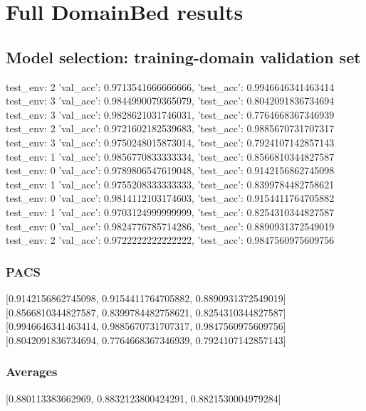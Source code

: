 \documentclass{article}
\begin{document}
\section{Full DomainBed results}

\subsection{Model selection: training-domain validation set}
test_env: 2
{'val_acc': 0.9713541666666666, 'test_acc': 0.9946646341463414}
test_env: 3
{'val_acc': 0.9844990079365079, 'test_acc': 0.8042091836734694}
test_env: 3
{'val_acc': 0.9828621031746031, 'test_acc': 0.7764668367346939}
test_env: 2
{'val_acc': 0.9721602182539683, 'test_acc': 0.9885670731707317}
test_env: 3
{'val_acc': 0.9750248015873014, 'test_acc': 0.7924107142857143}
test_env: 1
{'val_acc': 0.9856770833333334, 'test_acc': 0.8566810344827587}
test_env: 0
{'val_acc': 0.9789806547619048, 'test_acc': 0.9142156862745098}
test_env: 1
{'val_acc': 0.9755208333333333, 'test_acc': 0.8399784482758621}
test_env: 0
{'val_acc': 0.9814112103174603, 'test_acc': 0.9154411764705882}
test_env: 1
{'val_acc': 0.9703124999999999, 'test_acc': 0.8254310344827587}
test_env: 0
{'val_acc': 0.9824776785714286, 'test_acc': 0.8890931372549019}
test_env: 2
{'val_acc': 0.9722222222222222, 'test_acc': 0.9847560975609756}

\subsubsection{PACS}
[0.9142156862745098, 0.9154411764705882, 0.8890931372549019]
[0.8566810344827587, 0.8399784482758621, 0.8254310344827587]
[0.9946646341463414, 0.9885670731707317, 0.9847560975609756]
[0.8042091836734694, 0.7764668367346939, 0.7924107142857143]

\begin{center}
\end{center}

\subsubsection{Averages}
[0.880113383662969, 0.8832123800424291, 0.8821530004979284]

\begin{center}
\end{center}
\end{document}

